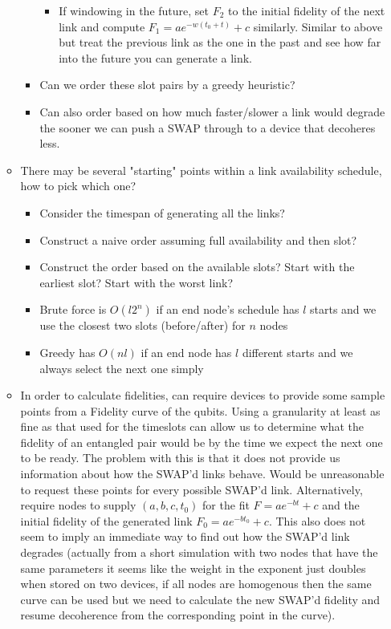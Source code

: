 \documentclass{article}
\begin{document}
\begin{itemize}
\begin{itemize}
\begin{itemize}
\begin{itemize}
                \item If windowing in the future, set $F_2$ to the initial fidelity of the next link and compute $F_1=ae^{-w(t_0+t)}+c$ similarly. Similar to above but treat the previous link as the one in the past and see how far into the future you can generate a link.
            \end{itemize}
            \item Can we order these slot pairs by a greedy heuristic?
            \item Can also order based on how much faster/slower a link would degrade the sooner we can push a SWAP through to a device that decoheres less.
        \end{itemize}
        \item There may be several "starting" points within a link availability schedule, how to pick which one?
        \begin{itemize}
            \item Consider the timespan of generating all the links?
            \item Construct a naive order assuming full availability and then slot?
            \item Construct the order based on the available slots?  Start with the earliest slot?  Start with the worst link?
            \item Brute force is $O(l2^n)$ if an end node's schedule has $l$ starts and we use the closest two slots (before/after) for $n$ nodes
            \item Greedy has $O(nl)$ if an end node has $l$ different starts and we always select the next one simply
        \end{itemize}
        \item In order to calculate fidelities, can require devices to provide some sample points from a Fidelity curve of the qubits. Using a granularity at least as fine as that used for the timeslots can allow us to determine what the fidelity of an entangled pair would be by the time we expect the next one to be ready. The problem with this is that it does not provide us information about how the SWAP'd links behave.  Would be unreasonable to request these points for every possible SWAP'd link.  Alternatively, require nodes to supply $(a,b,c,t_0)$ for the fit $F=ae^{-bt} + c$ and the initial fidelity of the generated link $F_0=ae^{-bt_0}+c$.  This also does not seem to imply an immediate way to find out how the SWAP'd link degrades (actually from a short simulation with two nodes that have the same parameters it seems like the weight in the exponent just doubles when stored on two devices, if all nodes are homogenous then the same curve can be used but we need to calculate the new SWAP'd fidelity and resume decoherence from the corresponding point in the curve).

\end{itemize}
\end{itemize}
\end{document}
